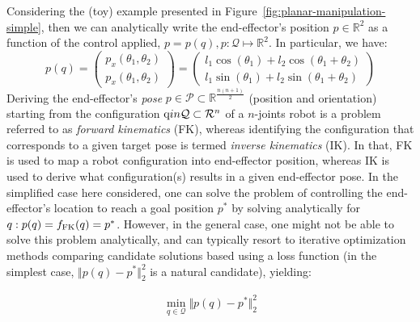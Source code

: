 Considering the (toy) example presented in Figure~\ref{fig:planar-manipulation-simple}, then we can analytically write the end-effector's position \( p \in \mathbb R^2 \) as a function of the control applied, \( p = p(q), p: \mathcal Q \mapsto \mathbb R^2 \). 
In particular, we have:
\begin{equation*}
p(q) = 
\begin{pmatrix}
p_x(\theta_1, \theta_2) \\  
p_x(\theta_1, \theta_2)
\end{pmatrix}
=
\begin{pmatrix}
l_1 \cos(\theta_1) + l_2 \cos(\theta_1 + \theta_2) \\
l_1 \sin(\theta_1) + l_2 \sin(\theta_1 + \theta_2)
\end{pmatrix}
\end{equation*}
Deriving the end-effector's \emph{pose} \( p \in \mathcal{P} \subset \mathbb{R}^{\frac{n(n+1)}{2}} \) (position and orientation) starting from the configuration \( {\textnormal{q}} in \mathcal Q \subset \mathcal R^n \) of a \( n \)-joints robot is a problem referred to as \emph{forward kinematics} (FK), whereas identifying the configuration that corresponds to a given target pose is termed \emph{inverse kinematics} (IK).
In that, FK is used to map a robot configuration into end-effector position, whereas IK is used to derive what configuration(s) results in a given end-effector pose.
In the simplified case here considered, one can solve the problem of controlling the end-effector's location to reach a goal position \( p^* \) by solving analytically for \( q: p(q) = f_{\text{FK}}(q) = p^*\).
However, in the general case, one might not be able to solve this problem analytically, and can typically resort to iterative optimization methods comparing candidate solutions based using a loss function (in the simplest case, \( \Vert p(q) - p^* \Vert_2^2 \) is a natural candidate), yielding:

\begin{align}
\min_{q \in \mathcal Q} \Vert p(q) - p^* \Vert_2^2
\label{eq:ik_problem}
\end{align}

